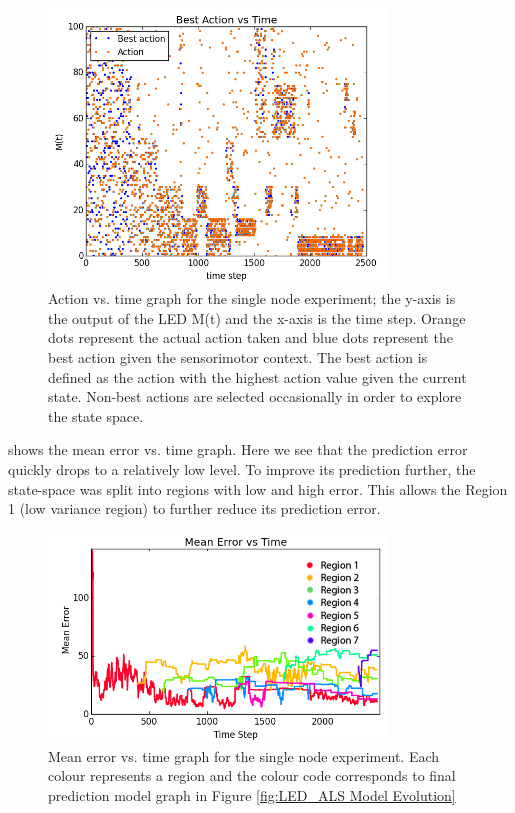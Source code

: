 \begin{figure} [!htb]
	\centering
	\includegraphics[width=0.8\textwidth]{"fig/validations/LED_ALS Action Selection"}
	\caption[Action vs. time graph for the single node experiment]{Action vs. time graph for the single node experiment; the y-axis is the output of the LED M(t) and the x-axis is the time step. Orange dots represent the actual action taken and blue dots represent the best action given the sensorimotor context. The best action is defined as the action with the highest action value given the current state. Non-best actions are selected occasionally in order to explore the state space.}
	\label{fig:LED_ALS Action Selection}
\end{figure}

 shows the mean error vs. time graph. Here we see that the prediction error quickly drops to a relatively low level. To improve its prediction further, the state-space was split into regions with low and high error. This allows the Region 1 (low variance region) to further reduce its prediction error.

\begin{figure}  [!htb]
	\centering
	\includegraphics[width=0.8\textwidth]{"fig/validations/LED_ALS Mean Error vs Time"}
	\caption[Mean error vs. time graph for the single node experiment]{Mean error vs. time graph for the single node experiment. Each colour represents a region and the colour code corresponds to final prediction model graph in Figure \ref{fig:LED_ALS Model Evolution} }
	\label{fig:LED_ALS Mean Error vs Time}
\end{figure}


